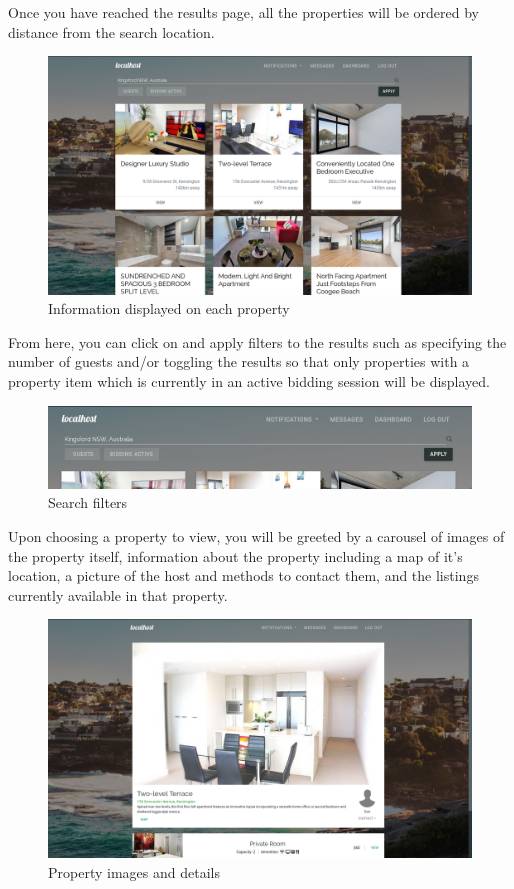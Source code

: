 Once you have reached the results page, all the properties will be ordered by
distance from the search location. 

\begin{figure}[!h]
  \includegraphics[width=\linewidth]{assets/userManual/searchResults.png}
  \caption{Information displayed on each property}
  \label{fig:searchResults}
\end{figure}

From here, you can click on and apply filters to the results such as specifying
the number of guests and/or toggling the results so that only properties with a 
property item which is currently in an active bidding session will be displayed.

\begin{figure}[!h]
  \includegraphics[width=\linewidth]{assets/userManual/searchFilters.png}
  \caption{Search filters}
  \label{fig:searchFilters}
\end{figure}

Upon choosing a property to view, you will be greeted by a carousel of images of
the property itself, information about the property including a map of it's
location, a picture of the host and methods to contact them, and the listings
currently available in that property.

\begin{figure}[!h]
  \includegraphics[width=\linewidth]{assets/userManual/propertyPg.png}
  \caption{Property images and details}
  \label{fig:propertyPg}
\end{figure}

